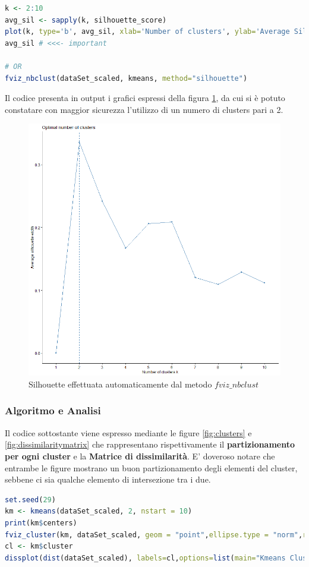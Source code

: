 \documentclass[letterpaper,11pt]{article}
\begin{document}
\begin{lstlisting}[language=R]
k <- 2:10
avg_sil <- sapply(k, silhouette_score)
plot(k, type='b', avg_sil, xlab='Number of clusters', ylab='Average Silhouette Scores', frame=FALSE)
avg_sil # <<<- important

# OR
fviz_nbclust(dataSet_scaled, kmeans, method="silhouette")
\end{lstlisting}
Il codice presenta in output i grafici espressi della figura \ref{fig:Silhouette2}, da cui si è potuto constatare con maggior sicurezza l'utilizzo di un numero di clusters pari a 2. 
\begin{figure}[H]
        \centering
     \includegraphics[width=0.7\linewidth]{Img/K-MEANS/KMEANS004.png}
     \caption{Silhouette effettuata automaticamente dal metodo $fviz\_nbclust$}\label{fig:Silhouette2}
\end{figure}

\subsubsection{Algoritmo e Analisi}
Il codice sottostante viene espresso mediante le figure  \ref{fig:clusters} e \ref{fig:dissimilaritymatrix} che rappresentano rispettivamente il \textbf{partizionamento per ogni cluster} e la \textbf{Matrice di dissimilarità}. E' doveroso notare che entrambe le figure mostrano un buon partizionamento degli elementi del cluster, sebbene ci sia qualche elemento di intersezione tra i due.
\begin{lstlisting}[language=R]
set.seed(29)
km <- kmeans(dataSet_scaled, 2, nstart = 10)
print(km$centers)
fviz_cluster(km, dataSet_scaled, geom = "point",ellipse.type = "norm",repel = TRUE)
cl <- km$cluster
dissplot(dist(dataSet_scaled), labels=cl,options=list(main="Kmeans Clustering With k=2"))
\end{lstlisting}
\end{document}
